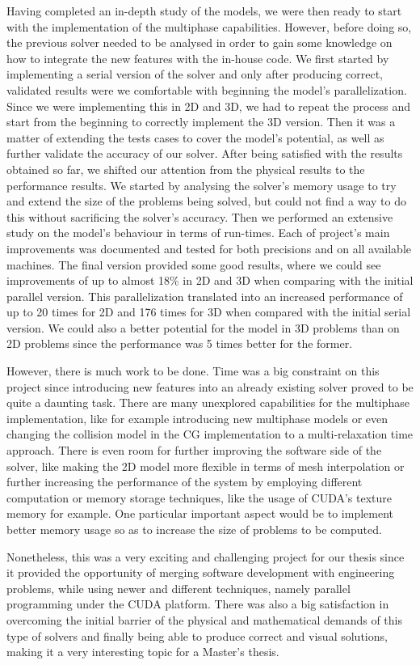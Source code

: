 \documentclass[12pt, openany]{book}
\begin{document}
Having completed an in-depth study of the models, we were then ready to start with the implementation of the multiphase capabilities. However, before doing so, the previous solver needed to be analysed in order to gain some knowledge on how to integrate the new features with the in-house code. We first started by implementing a serial version of the solver and only after producing correct, validated results were we comfortable with beginning the model's parallelization. Since we were implementing this in 2D and 3D, we had to repeat the process and start from the beginning to correctly implement the 3D version. Then it was a matter of extending the tests cases to cover the model's potential, as well as further validate the accuracy of our solver. After being satisfied with the results obtained so far, we shifted our attention from the physical results to the performance results. We started by analysing the solver's memory usage to try and extend the size of the problems being solved, but could not find a way to do this without sacrificing the solver's accuracy. Then we performed an extensive study on the model's behaviour in terms of run-times. Each of project's main improvements was documented and tested for both precisions and on all available machines. The final version provided some good results, where we could see improvements of up to almost 18\% in 2D and 3D when comparing with the initial parallel version. This parallelization translated into an increased performance of up to 20 times for 2D and 176 times for 3D when compared with the initial serial version. We could also a better potential for the model in 3D problems than on 2D problems since the performance was 5 times better for the former.\par
However, there is much work to be done. Time was a big constraint on this project since introducing new features into an already existing solver proved to be quite a daunting task. There are many unexplored capabilities for the multiphase implementation, like for example introducing new multiphase models or even changing the collision model in the CG implementation to a multi-relaxation time approach. There is even room for further improving the software side of the solver, like making the 2D model more flexible in terms of mesh interpolation or further increasing the performance of the system by employing different computation or memory storage techniques, like the usage of CUDA's texture memory for example. One particular important aspect would be to implement better memory usage so as to increase the size of problems to be computed. \par
Nonetheless, this was a very exciting and challenging project for our thesis since it provided the opportunity of merging software development with engineering problems, while using newer and different techniques, namely parallel programming under the CUDA platform. There was also a big satisfaction in overcoming the initial barrier of the physical and mathematical demands of this type of solvers and finally being able to produce correct and visual solutions, making it a very interesting topic for a Master's thesis.          
\end{document}
